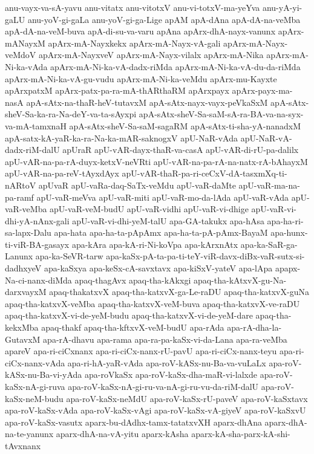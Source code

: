 {anu-vayx-va-sA-yavu
anu-vitatx
anu-vitotxV
anu-vi-totxV-ma-yeYva
anu-yA-yi-gaLU
anu-yoV-gi-gaLa
anu-yoV-gi-ga-Lige
apAM
apA-dAna
apA-dA-na-veMba
apA-dA-na-veM-buva
apA-di-su-va-varu
apAna
apArx-dhA-nayx-vanunx
apArx-mANayxM
apArx-mA-Nayxkekx
apArx-mA-Nayx-vA-gali
apArx-mA-Nayx-veMdoV
apArx-mA-NayxveV
apArx-mA-Nayx-vilalx
apArx-mA-Nika
apArx-mA-Ni-ka-vAda
apArx-mA-Ni-ka-vA-dadx-riMda
apArx-mA-Ni-ka-vA-du-da-riMda
apArx-mA-Ni-ka-vA-gu-vudu
apArx-mA-Ni-ka-veMdu
apArx-mu-Kayxte
apArxpatxM
apArx-patx-pa-ra-mA-thARthaRM
apArxpayx
apArx-payx-ma-nasA
apA-sAtx-na-thaR-heV-tutavxM
apA-sAtx-nayx-vayx-peVkaSxM
apA-sAtx-sheV-Sa-ka-ra-Na-deY-va-ta-sAyxpi
apA-sAtx-sheV-Sa-saM-sA-ra-BA-va-na-syx-va-mA-tamxnaH
apA-sAtx-sheV-Sa-saM-sagaRM
apA-sAtx-ti-sha-yA-nanadxM
apA-satx-kA-yaR-ka-ra-Na-ka-mAR-saknogxV
apU-NaR-vAda
apU-NaR-vA-dadx-riM-dalU
apUraR
apU-vAR-dayx-thaR-va-casA
apU-vAR-di-rU-pa-dalilx
apU-vAR-na-pa-rA-duyx-ketxV-neVRti
apU-vAR-na-pa-rA-na-natx-rA-bAhayxM
apU-vAR-na-pa-reV-tAyxdAyx
apU-vAR-thaR-pa-ri-ceCxV-dA-tasxmXq-ti-nARtoV
apUvaR
apU-vaRa-daq-SaTx-veMdu
apU-vaR-daMte
apU-vaR-ma-na-pa-ramf
apU-vaR-meVva
apU-vaR-miti
apU-vaR-mo-da-lAda
apU-vaR-vAda
apU-vaR-veMba
apU-vaR-veM-budU
apU-vaR-vidhi
apU-vaR-vi-dhige
apU-vaR-vi-dhi-yA-nAnx-gali
apU-vaR-vi-dhi-yeM-talU
apa-GA-takukx
apa-hAsa
apa-ha-ri-sa-lapx-Dalu
apa-hata
apa-ha-ta-pApAmx
apa-ha-ta-pA-pAmx-BayaM
apa-hunx-ti-viR-BA-gasayx
apa-kAra
apa-kA-ri-Ni-koVpa
apa-kArxnAtx
apa-ka-SaR-ga-Lanunx
apa-ka-SeVR-tarw
apa-kaSx-pA-ta-pa-ti-teY-viR-davx-diBx-vaR-sutx-si-dadhxyeV
apa-kaSxya
apa-keSx-cA-savxtavx
apa-kiSxV-yateV
apa-lApa
apapx-Na-ci-nanx-diMda
apaq-thagAvx
apaq-tha-kAkxgi
apaq-tha-kAtxvX-gu-Na-darxvayxM
apaq-thakatxvX
apaq-tha-katxvX-ga-Le-raDU
apaq-tha-katxvX-guNa
apaq-tha-katxvX-veMba
apaq-tha-katxvX-veM-buva
apaq-tha-katxvX-ve-raDU
apaq-tha-katxvX-vi-de-yeM-budu
apaq-tha-katxvX-vi-de-yeM-dare
apaq-tha-kekxMba
apaq-thakf
apaq-tha-kftxvX-veM-budU
apa-rAda
apa-rA-dha-la-GutavxM
apa-rA-dhavu
apa-rama
apa-ra-pa-kaSx-vi-da-Lana
apa-ra-veMba
apareV
apa-ri-ciCxnanx
apa-ri-ciCx-nanx-rU-pavU
apa-ri-ciCx-nanx-teyu
apa-ri-ciCx-nanx-vAda
apa-ri-hA-yaR-vAda
apa-roV-kASx-nu-Ba-va-vuLaLx
apa-roV-kASx-nu-Ba-vi-yAda
apa-roVkaSx
apa-roV-kaSx-dha-maR-vi-lalxde
apa-roV-kaSx-nA-gi-ruva
apa-roV-kaSx-nA-gi-ru-va-nA-gi-ru-vu-da-riM-dalU
apa-roV-kaSx-neM-budu
apa-roV-kaSx-neMdU
apa-roV-kaSx-rU-paveV
apa-roV-kaSxtavx
apa-roV-kaSx-vAda
apa-roV-kaSx-vAgi
apa-roV-kaSx-vA-giyeV
apa-roV-kaSxvU
apa-roV-kaSx-vasutx
aparx-bu-dAdhx-tamx-tatatxvXH
aparx-dhAna
aparx-dhA-na-te-yanunx
aparx-dhA-na-vA-yitu
aparx-kAsha
aparx-kA-sha-parx-kA-shi-tAvxnanx
}
